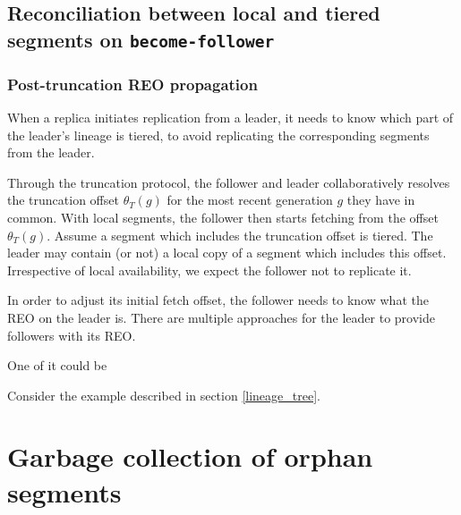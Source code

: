 \documentclass{article}
\begin{document}
\subsection{Reconciliation between local and tiered segments on \texttt{become-follower}}

\subsubsection{Post-truncation REO propagation}

When a replica initiates replication from a leader, it needs to know which part of the leader's lineage is tiered, to avoid replicating the corresponding segments from the leader.

Through the truncation protocol, the follower and leader collaboratively resolves the truncation offset $\theta_T(g)$ for the most recent generation $g$ they have in common. With local segments, the follower then starts fetching from the offset $\theta_T(g)$. Assume a segment which includes the truncation offset is tiered. The leader may contain (or not) a local copy of a segment which includes this offset. Irrespective of local availability, we expect the follower not to replicate it.

In order to adjust its initial fetch offset, the follower needs to know what the REO on the leader is. There are multiple approaches for the leader to provide followers with its REO.

One of it could be 

Consider the example described in section \ref{lineage_tree}. 

\newpage
\section{Garbage collection of orphan segments}

\newpage

{}
\end{document}
